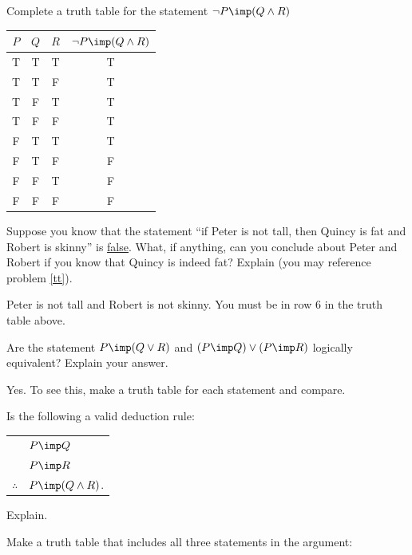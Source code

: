 \begin{questions}


\question\label{tt} Complete a truth table for the statement $\neg P \imp (Q \wedge R)$

  \begin{answer}
    \begin{tabular}{c|c|c||c}
                     $P$&$Q$&$R$& $\neg P \imp (Q \wedge R)$ \\ \hline
                     T & T & T & T\\
                     T & T & F & T\\
                     T & F & T & T\\
                     T & F & F & T \\
                     F & T & T & T\\
                     F & T & F & F\\
                     F & F & T & F\\
                     F & F & F & F
                    \end{tabular}
  \end{answer}


\question Suppose you know that the statement ``if Peter is not tall, then Quincy is fat and Robert is skinny'' is \underline{false}.  What, if anything, can you conclude about Peter and Robert if you know that Quincy is indeed fat?  Explain (you may reference problem \ref{tt}).

  \begin{answer}
    Peter is not tall and Robert is not skinny.  You must be in row 6 in the truth table above.
  \end{answer}


\question Are the statement $P \imp (Q \vee R)$ and $(P \imp Q) \vee (P \imp R)$ logically equivalent?  Explain your answer.

  \begin{answer}
    Yes.  To see this, make a truth table for each statement and compare.
  \end{answer}



\question Is the following a valid deduction rule: \begin{tabular}{rl} & $P \imp Q$ \\ & $P\imp R$ \\ \hline $\therefore$ & $P \imp (Q \wedge R)$.\end{tabular}  Explain.

  \begin{answer}
    Make a truth table that includes all three statements in the argument:


\end{answer}
\end{questions}
